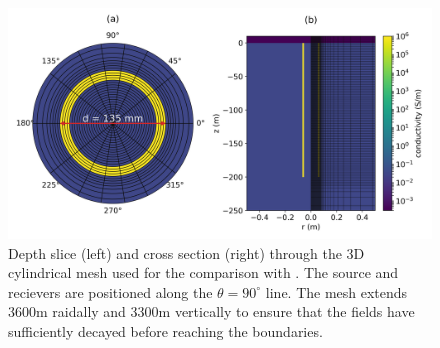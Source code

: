 \begin{figure}
    \begin{center}
    \includegraphics[width=0.8\columnwidth]{figures/casing_software/commer_model.png}
    \end{center}
\caption{
    Depth slice (left) and cross section (right) through the 3D cylindrical
    mesh used for the comparison with \cite{Commer2015}.
    The source and recievers are positioned along the $\theta = 90^\circ$ line.
    The mesh extends 3600m raidally and 3300m vertically to ensure that the fields
    have sufficiently decayed before reaching the boundaries.
}
\label{fig:commer_model}
\end{figure}
